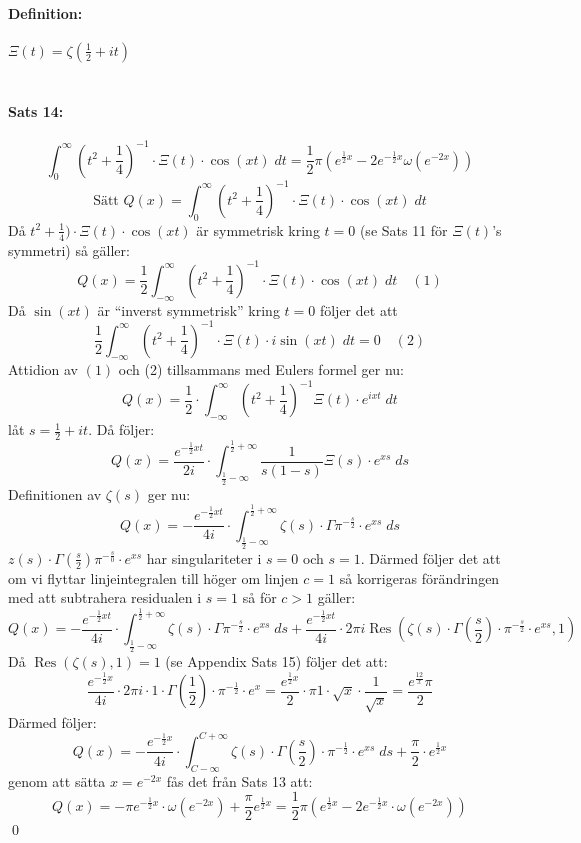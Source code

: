 \documentclass{article}%
\begin{document}
\paragraph{Definition:} $\Xi(t) = \zeta(\frac 1 2 + it)$\\
\\
\paragraph{Sats 14:} 
\[
	\int_0^\infty (t^2 + \frac 1 4)^{-1} \cdot \Xi(t) \cdot \cos(xt) \; dt = \frac 1 2 \pi(e^{\tfrac 1 2 x} -
		2e^{-\tfrac 1 2 x} \omega(e^{- 2 x}))
\]
\[
	\text{Sätt } Q(x) = \int_0^\infty (t^2 + \frac 1 4)^{-1} \cdot \Xi(t) \cdot \cos(xt) \; dt
\]
Då $t^2 + \frac 1 4) \cdot \Xi(t) \cdot \cos(xt)$ är symmetrisk kring $t = 0$ (se Sats 11 för $\Xi(t)$'s symmetri)
så gäller:
\[
	Q(x) = \frac 1 2 \int_{-\infty}^\infty (t^2 + \frac 1 4)^{- 1} \cdot \Xi(t) \cdot \cos(xt) \; dt \quad (1)
\]
Då $\sin(xt)$ är ``inverst symmetrisk'' kring $t = 0$ följer det att 
\[
	\frac 1 2 \int_{-\infty}^\infty (t^2 + \frac 1 4)^{- 1} \cdot \Xi(t) \cdot i\sin(xt) \; dt = 0 \quad (2)
\]
Attidion av $(1)$ och (2) tillsammans med Eulers formel ger nu: 
\[
	Q(x) = \frac 1 2 \cdot \int_{- \infty}^\infty (t^2 + \frac 1 4)^{-1} \Xi(t)\cdot e^{ixt} \; dt
\]
låt $s = \frac 1 2 + it$. Då följer:
\[
	Q(x) = \frac 
	{
		e^{- \tfrac 1 2 x t}
	}
	{
		2i
	}
	\cdot \int_{\tfrac 1 2 - \infty}^{\tfrac 1 2 + \infty} \frac {1} {s(1-s)} \Xi(s) \cdot e^{xs} \; ds
\]
Definitionen av $\zeta(s)$ ger nu:
\[
	Q(x) = - \frac {e^{- \frac 1 2 xt}} {4i} \cdot \int_{\tfrac 1 2 - \infty}^{\tfrac 1 2 + \infty} \zeta(s) \cdot \Gamma
		\pi^{- \frac s 2} \cdot e^{xs} \; ds
\]
$z(s) \cdot \Gamma(\frac s 2) \pi^{- \frac s 0} \cdot e^{xs}$ har singulariteter i $s = 0$ och $s = 1$.
Därmed följer det att om vi flyttar linjeintegralen till höger om linjen $c=1$ så korrigeras förändringen med att 
subtrahera residualen i $s = 1$ så för $c > 1$ gäller:
\[
	Q(x) = - \frac {e^{- \frac 1 2 xt}} {4i} \cdot \int_{\tfrac 1 2 - \infty}^{\tfrac 1 2 + \infty} \zeta(s) \cdot \Gamma
		\pi^{- \frac s 2} \cdot e^{xs} \; ds + \frac {e^{- \frac 1 2 xt}} {4i} \cdot2 \pi i \operatorname{Res}(\zeta(s) \cdot
		\Gamma(\frac s 2) \cdot \pi^{-\frac s 2} \cdot e^{xs}, 1)
\]
Då $\operatorname{Res}(\zeta(s), 1) = 1$ (se Appendix Sats 15) följer det att:
\[
	\frac {e^{- \frac 1 2 x}} {4i} \cdot 2 \pi i \cdot 1 \cdot \Gamma(\frac 1 2) \cdot \pi^{- \frac 1 2} \cdot e^x =
		\frac {e^{\frac 1 2 x}} {2} \cdot \pi 1 \cdot \sqrt{x} \cdot \frac {1} {\sqrt{x}} = \frac {e^{\frac {1 2} x} \pi} {2}
\]
Därmed följer:
\[
	Q(x) = - \frac {e^{-\frac 1 2 x}} {4 i} \cdot \int_{C - \infty}^{C + \infty} \zeta(s) \cdot \Gamma(\frac s 2)
		\cdot \pi^{- \frac 1 2} \cdot e^{xs} \; ds + \frac \pi 2 \cdot e^{\frac 1 2 x}
\]
genom att sätta $x = e^{-2x}$ fås det från Sats 13 att:
\[
	Q(x) = - \pi e^{- \frac 1 2 x} \cdot \omega(e^{- 2 x}) + \frac \pi 2 e^{\frac 1 2 x} = \frac 1 2 \pi
		(e^{\frac 1 2 x} - 2 e^{- \frac 1 2 x} \cdot \omega(e^{-2x}))
\]
\hfill \qed
\end{document}
